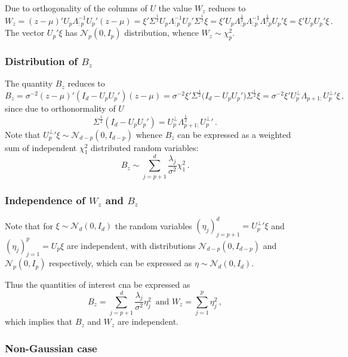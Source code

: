 \documentclass[a4paper,14pt]{article}
\begin{document}
Due to orthogonality of the columns of $U$ the value $W_z$ reduces to
$$ W_z
    = (z-\mu)'U_p\Lambda_{:p}^{-1}U_p'(z-\mu)
    = \xi' \Sigma^\frac{1}{2} U_p\Lambda_{:p}^{-1}U_p' \Sigma^\frac{1}{2} \xi
    = \xi' U_p \Lambda_{:p}^\frac{1}{2}\Lambda_{:p}^{-1}\Lambda_{:p}^\frac{1}{2} U_p' \xi
    = \xi' U_p U_p' \xi
    \,.$$
The vector $U_p' \xi$ has $\mathcal{N}_p(0, I_p)$ distribution, whence $W_z \sim \chi^2_p$.


\subsubsection{Distribution of $B_z$} %
\label{ssub:distribution_of_b_z}

The quantity $B_z$ reduces to
$$ B_z
    = \sigma^{-2} (z-\mu)' (I_d - U_p  U_p') (z-\mu)
    = \sigma^{-2} \xi' \Sigma^\frac{1}{2} \bigl(I_d - U_p  U_p'\bigr) \Sigma^\frac{1}{2} \xi
    = \sigma^{-2} \xi' U_p^\perp \Lambda_{p+1:} {U_p^\perp}' \xi
    \,,$$
since due to orthonormality of $U$
$$ \Sigma^\frac{1}{2} (I_d - U_p  U_p')
    = U_p^\perp \Lambda_{p+1:}^\frac{1}{2} {U_p^\perp}'
    \,.$$
Note that ${U_p^\perp}' \xi \sim \mathcal{N}_{d-p}(0, I_{d-p})$ whence $B_z$ can be expressed
as a weighted sum of independent $\chi^2_1$ distributed random variables:
$$ B_z \sim \sum_{j=p+1}^d \frac{\lambda_j}{\sigma^2} \chi^2_1\,.$$


\subsubsection{Independence of $W_z$ and $B_z$} %
\label{ssub:independence_of_w_z_and_b_z}

Note that for $\xi \sim \mathcal{N}_d(0, I_d)$ the random variables $(\eta_j)_{j=p+1}^d = {U_p^\perp}'\xi$
and $(\eta_j)_{j=1}^p = U_p\xi$ are independent, with distributions $\mathcal{N}_{d-p}(0, I_{d-p})$
and $\mathcal{N}_p(0, I_p)$ respectively, which can be expressed as $\eta\sim \mathcal{N}_d(0, I_d)$.

Thus the quantities of interest cna be expressed as
$$ B_z = \sum_{j=p+1}^d \frac{\lambda_j}{\sigma^2} \eta_j^2\,
    \text{ and }
   W_z = \sum_{j=1}^p \eta_j^2\,,$$
which implies that $B_z$ and $W_z$ are independent.


\subsubsection{Non-Gaussian case} %
\label{ssub:non_gaussian_case}
\end{document}
